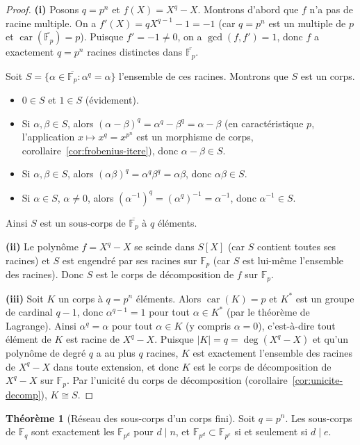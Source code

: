 \documentclass[12pt,a4paper,openany]{book}
\theoremstyle{definition}
\newtheorem{theoreme}{Théorème}[chapter]
\newcommand{\F}{\mathbb{F}}
\newcommand{\car}{\operatorname{car}}
\renewcommand{\deg}{\operatorname{deg}}
\begin{document}
\begin{proof}
\textbf{(i)} Posons $q = p^n$ et $f(X) = X^q - X$. Montrons d'abord que $f$
n'a pas de racine multiple. On a $f'(X) = qX^{q-1} - 1 = -1$ (car $q = p^n$
est un multiple de $p$ et $\car(\overline{\F_p}) = p$). Puisque $f' = -1 \neq 0$,
on a $\gcd(f, f') = 1$, donc $f$ a exactement $q = p^n$ racines distinctes dans
$\overline{\F_p}$.

Soit $S = \{\alpha \in \overline{\F_p} : \alpha^q = \alpha\}$ l'ensemble de ces
racines. Montrons que $S$ est un corps.
\begin{itemize}
  \item $0 \in S$ et $1 \in S$ (évidement).
  \item Si $\alpha, \beta \in S$, alors
    $(\alpha - \beta)^q = \alpha^q - \beta^q = \alpha - \beta$ (en
    caractéristique $p$, l'application $x \mapsto x^q = x^{p^n}$ est un
    morphisme de corps, corollaire~\ref{cor:frobenius-itere}), donc
    $\alpha - \beta \in S$.
  \item Si $\alpha, \beta \in S$, alors
    $(\alpha\beta)^q = \alpha^q \beta^q = \alpha\beta$, donc $\alpha\beta \in S$.
  \item Si $\alpha \in S$, $\alpha \neq 0$, alors
    $(\alpha^{-1})^q = (\alpha^q)^{-1} = \alpha^{-1}$, donc $\alpha^{-1} \in S$.
\end{itemize}
Ainsi $S$ est un sous-corps de $\overline{\F_p}$ à $q$ éléments.

\textbf{(ii)} Le polynôme $f = X^q - X$ se scinde dans $S[X]$ (car $S$ contient
toutes ses racines) et $S$ est engendré par ses racines sur $\F_p$ (car $S$ est
lui-même l'ensemble des racines). Donc $S$ est le corps de décomposition de $f$
sur $\F_p$.

\textbf{(iii)} Soit $K$ un corps à $q = p^n$ éléments. Alors $\car(K) = p$ et
$K^*$ est un groupe de cardinal $q - 1$, donc $\alpha^{q-1} = 1$ pour tout
$\alpha \in K^*$ (par le théorème de Lagrange). Ainsi $\alpha^q = \alpha$ pour
tout $\alpha \in K$ (y compris $\alpha = 0$), c'est-à-dire tout élément de $K$
est racine de $X^q - X$. Puisque $|K| = q = \deg(X^q - X)$ et qu'un polynôme
de degré $q$ a au plus $q$ racines, $K$ est exactement l'ensemble des racines de
$X^q - X$ dans toute extension, et donc $K$ est le corps de décomposition de
$X^q - X$ sur $\F_p$. Par l'unicité du corps de décomposition
(corollaire~\ref{cor:unicite-decomp}), $K \cong S$.
\end{proof}

\begin{theoreme}[Réseau des sous-corps d'un corps fini]\label{thm:sous-corps-fini}
Soit $q = p^n$. Les sous-corps de $\F_{q}$ sont exactement les $\F_{p^d}$ pour
$d \mid n$, et $\F_{p^d} \subset \F_{p^e}$ si et seulement si $d \mid e$.
\end{theoreme}
\end{document}
